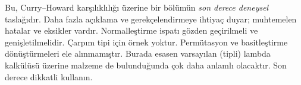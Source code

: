 \documentclass[../../../include/open-logic-chapter]{subfiles}
\begin{document}
\begin{editorial}
  Bu, Curry--Howard karşılıklılığı üzerine bir bölümün \emph{son derece
  deneysel} taslağıdır. Daha fazla açıklama ve gerekçelendirmeye ihtiyaç
  duyar; muhtemelen hatalar ve eksikler vardır. Normalleştirme ispatı gözden
  geçirilmeli ve genişletilmelidir. Çarpım tipi için örnek yoktur.
  Permütasyon ve basitleştirme dönüştürmeleri ele alınmamıştır. Burada esasen
  varsayılan (tipli) lambda kalkülüsü üzerine malzeme de bulunduğunda çok daha
  anlamlı olacaktır. Son derece dikkatli kullanın.
\end{editorial}
\OLEndChapterHook
\end{document}
